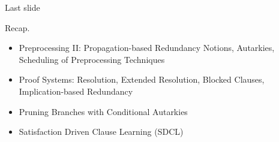 \documentclass[t]{sdqbeamer}
\begin{document}
\begin{frame}{Last slide}
\begin{block}{Recap.}
\begin{itemize}\setlength{\itemsep}{1em}
    \item Preprocessing II: Propagation-based Redundancy Notions, Autarkies, Scheduling of Preprocessing Techniques
    \item Proof Systems: Resolution, Extended Resolution, Blocked Clauses, Implication-based Redundancy
    \item Pruning Branches with Conditional Autarkies
    \item Satisfaction Driven Clause Learning (SDCL)
\end{itemize}
\end{block}
\end{frame}

\end{document}
